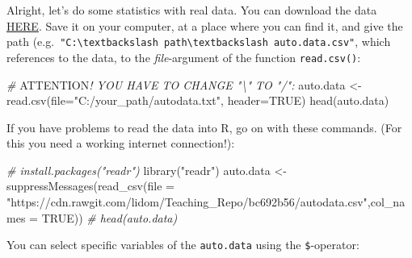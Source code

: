 \documentclass[
]{book}
\newenvironment{Shaded}{\begin{snugshade}}{\end{snugshade}}
\newcommand{\AlertTok}[1]{\textcolor[rgb]{0.94,0.16,0.16}{#1}}
\newcommand{\AttributeTok}[1]{\textcolor[rgb]{0.77,0.63,0.00}{#1}}
\newcommand{\CommentTok}[1]{\textcolor[rgb]{0.56,0.35,0.01}{\textit{#1}}}
\newcommand{\ConstantTok}[1]{\textcolor[rgb]{0.00,0.00,0.00}{#1}}
\newcommand{\DocumentationTok}[1]{\textcolor[rgb]{0.56,0.35,0.01}{\textbf{\textit{#1}}}}
\newcommand{\FunctionTok}[1]{\textcolor[rgb]{0.00,0.00,0.00}{#1}}
\newcommand{\NormalTok}[1]{#1}
\newcommand{\OtherTok}[1]{\textcolor[rgb]{0.56,0.35,0.01}{#1}}
\newcommand{\SpecialCharTok}[1]{\textcolor[rgb]{0.00,0.00,0.00}{#1}}
\newcommand{\StringTok}[1]{\textcolor[rgb]{0.31,0.60,0.02}{#1}}
\begin{document}
Alright, let's do some statistics with real data. You can download the data \href{https://github.com/lidom/Teaching_Repo}{HERE}. Save it on your computer, at a place where you can find it, and give the path (e.g.~\texttt{"C:\textbackslash{}textbackslash\ path\textbackslash{}textbackslash\ auto.data.csv"}, which references to the data, to the \emph{file}-argument of the function \texttt{read.csv()}:

\begin{Shaded}
\begin{Highlighting}[]
\CommentTok{\# }\AlertTok{ATTENTION}\CommentTok{! YOU HAVE TO CHANGE "\textbackslash{}" TO "/":}
\NormalTok{auto.data }\OtherTok{\textless{}{-}} \FunctionTok{read.csv}\NormalTok{(}\AttributeTok{file=}\StringTok{"C:/your\_path/autodata.txt"}\NormalTok{, }\AttributeTok{header=}\ConstantTok{TRUE}\NormalTok{)}
\FunctionTok{head}\NormalTok{(auto.data)}
\end{Highlighting}
\end{Shaded}

\hfill\break

If you have problems to read the data into R, go on with these commands. (For this you need a working internet connection!):

\begin{Shaded}
\begin{Highlighting}[]
\CommentTok{\# install.packages("readr")}
\FunctionTok{library}\NormalTok{(}\StringTok{"readr"}\NormalTok{)}
\NormalTok{auto.data }\OtherTok{\textless{}{-}} \FunctionTok{suppressMessages}\NormalTok{(}\FunctionTok{read\_csv}\NormalTok{(}\AttributeTok{file =} \StringTok{"https://cdn.rawgit.com/lidom/Teaching\_Repo/bc692b56/autodata.csv"}\NormalTok{,}\AttributeTok{col\_names =} \ConstantTok{TRUE}\NormalTok{))}
\CommentTok{\# head(auto.data)}
\end{Highlighting}
\end{Shaded}

\hfill\break

You can select specific variables of the \texttt{auto.data} using the \texttt{\$}-operator:

\begin{Shaded}
\end{Shaded}
\end{document}
